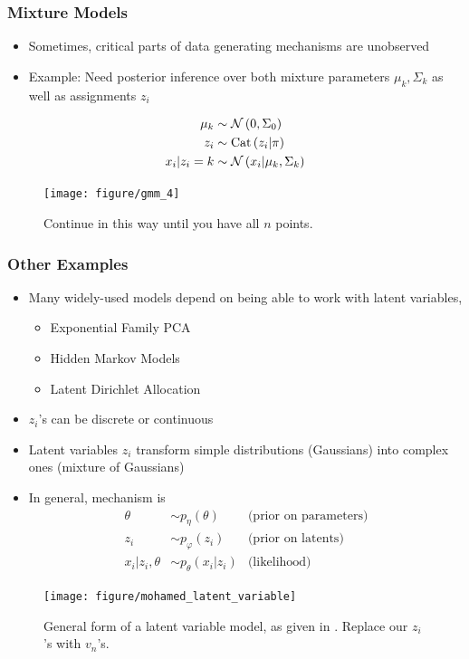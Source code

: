 \documentclass[10pt,mathserif]{beamer}
\begin{document}
\label{sec:latent_variable_models}
\begin{frame}
  \frametitle{Mixture Models}
  \begin{itemize}
  \item Sometimes, critical parts of data generating mechanisms are unobserved
    \item Example: Need posterior inference over both mixture parameters $\mu_k,
      \Sigma_k$ as well as assignments $z_i$
  \end{itemize}
  \begin{align*}
    \mu_{k} &\sim \mathcal{N}\left(0, \Sigma_{0}\right) \\
    z_i &\sim \textnormal{Cat}\left(z_i \vert \pi\right) \\
    x_i \vert z_i = k &\sim \mathcal{N}\left(x_i \vert \mu_{k}, \Sigma_k\right)
  \end{align*}
\begin{figure}[ht]
  \centering
  \texttt{[image: figure/gmm\_4]}
  \caption{Continue in this way until you have all $n$ points. \label{fig:gmm_4}}
\end{figure}
\end{frame}

\begin{frame}
  \frametitle{Other Examples}
  \begin{itemize}
  \item Many widely-used models depend on being able to work with latent variables,
    \begin{itemize}
    \item Exponential Family PCA
    \item Hidden Markov Models
    \item Latent Dirichlet Allocation
    \end{itemize}
  \item $z_i$'s can be discrete or continuous
  \item Latent variables $z_i$ transform simple distributions (Gaussians) into
    complex ones (mixture of Gaussians)
  \item In general, mechanism is
    \begin{align*}
      \theta &\sim p_{\eta}\left(\theta\right) &\text{(prior on parameters)} \\
      z_{i} &\sim p_{\varphi}\left(z_{i}\right) &\text{(prior on latents)} \\
      x_{i} \vert z_{i}, \theta &\sim p_{\theta}\left(x_{i} \vert z_{i} \right) &\text{(likelihood)}
    \end{align*}
  \end{itemize}
  \begin{figure}[ht]
    \centering
    \texttt{[image: figure/mohamed\_latent\_variable]}
    \caption{General form of a latent variable model, as given in
      \citep{mohamed2011generalised}. Replace our $z_i$'s with
      $v_n$'s. \label{fig:mohamed_latent_variable} }
  \end{figure}
\end{frame}
\end{document}
